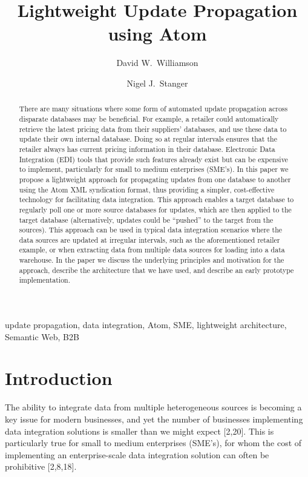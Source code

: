 \documentclass{CRPITStyle}
\title{Lightweight Update Propagation using Atom}
\author{David W.\ Williamson \and Nigel J.\ Stanger}
\affiliation{Department of Information Science, University of Otago, \\
	PO Box 56, Dunedin, New Zealand \\
	Email:~\texttt{\{dwilliamson,nstanger\}@infoscience.otago.ac.nz}}
\begin{document}
\maketitle

\begin{abstract}
There are many situations where some form of automated update
propagation across disparate databases may be beneficial. For example, a
retailer could automatically retrieve the latest pricing data from their
suppliers' databases, and use these data to update their own internal
database. Doing so at regular intervals ensures that the retailer always
has current pricing information in their database. Electronic Data
Integration (EDI) tools that provide such features already exist but can
be expensive to implement, particularly for small to medium enterprises
(SME's). In this paper we propose a lightweight approach for propagating
updates from one database to another using the Atom XML syndication
format, thus providing a simpler, cost-effective technology for
facilitating data integration. This approach enables a target database
to regularly poll one or more source databases for updates, which are
then applied to the target database (alternatively, updates could be
``pushed'' to the target from the sources). This approach can be used in
typical data integration scenarios where the data sources are updated at
irregular intervals, such as the aforementioned retailer example, or
when extracting data from multiple data sources for loading into a data
warehouse. In the paper we discuss the underlying principles and
motivation for the approach, describe the architecture that we have
used, and describe an early prototype implementation.
\end{abstract}
\vspace{.1in}

 update propagation, data integration, Atom,
SME, lightweight architecture, Semantic Web, B2B

\section{Introduction}

The ability to integrate data from multiple heterogeneous sources is
becoming a key issue for modern businesses, and yet the number of
businesses implementing data integration solutions is smaller than we
might expect [2,20]. This is particularly true for small to medium
enterprises (SME's), for whom the cost of implementing an
enterprise-scale data integration solution can often be prohibitive
[2,8,18].
\end{document}
